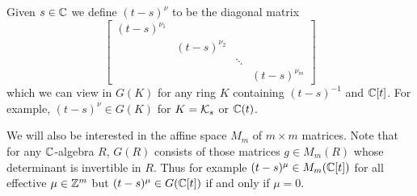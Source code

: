 \documentclass{article} %
\begin{document}
% 
% 
Given $s\in\mathbb C$ we define $(t-s)^\nu$ to be the diagonal matrix 
\[
\begin{bmatrix}
    (t-s)^{\nu_1} \\
    & (t-s)^{\nu_2} \\ 
    & & \ddots \\
    & & & (t-s)^{\nu_m}
\end{bmatrix} 
\]
which we can view in 
$G(K)$ for any ring $ K $ containing $(t-s)^{-1}$ and $\mathbb C[t]$. For example, $(t-s)^\nu\in G(K)$ for $ K = \mathcal K_s$ or $\mathbb C(t)$. %


We will also be interested in the affine space $ M_m$ of $m\times m$ matrices.  Note that for any $ \mathbb C$-algebra $ R $, 
$G(R)$ consists of those matrices $ g \in M_m(R) $ whose determinant is invertible in $ R$. Thus for example $ (t-s)^\mu\in M_m(\mathbb C[t])$ for all effective $ \mu \in \mathbb Z^m$ but 
$(t-s)^\mu\in G(\mathbb C[t])$ if and only if $ \mu = 0 $.
% 
\end{document}
